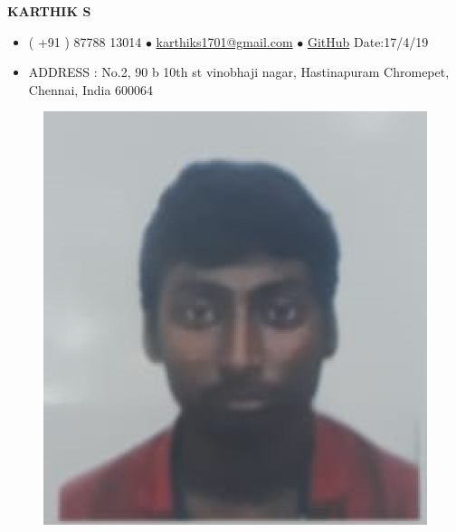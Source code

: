 \documentclass[10pts]{report}
\newcommand{\tab}[1]{\hspace{.2667\textwidth}\rlap{#1}}
\begin{document}
\centering 
 \textbf{KARTHIK S  }     


\begin{itemize}         

\item( +91 ) 87788 13014 
 $\bullet$  \href{mailto:karthiks1701@gmail.com}{karthiks1701@gmail.com}
 $\bullet$ \href{https://github.com/karthiks1701/karthiks1701}{GitHub}  \tab{} Date:17/4/19
\item{ ADDRESS : No.2, 90 b 10th st vinobhaji nagar, Hastinapuram Chromepet, Chennai, India 600064}
\end{itemize}

                           
                         


\begin{figure}{}

\centering
\graphicspath{{./images/}}
\includegraphics[scale=0.2]{capture.png}


\end{figure}
\end{document}
